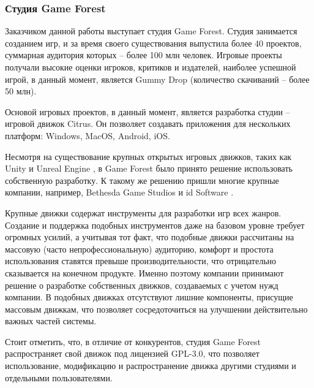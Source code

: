 \documentclass{fefu}
\begin{document}
			\subsubsection{Студия Game Forest}
				\par Заказчиком данной работы выступает студия Game Forest. \cite{GFPortal} 
				Студия занимается созданием игр, и за время своего существования выпустила 
				более 40 проектов, суммарная аудитория которых -- более 100 млн человек. 
				Игровые проекты получали высокие оценки игроков, критиков и издателей, наиболее 
				успешной игрой, в данный момент, является Gummy Drop (количество скачиваний -- 
				более 50 млн)\cite{GummyDropPage}.
				\par Основой игровых проектов, в данный момент, является разработка студии -- 
				игровой движок Citrus. Он позволяет создавать приложения для нескольких
				платформ: Windows, MacOS, Android, iOS.
				\par Несмотря на существование крупных открытых игровых движков, таких как 
				Unity \cite{UnitySite} и Unreal Engine \cite{UnrealEngineSite}, 
				в Game Forest было принято решение использовать собственную разработку. К 
				такому же решению пришли многие крупные компании, например, Bethesda Game 
				Studios \cite{BethesdaEngine} и id Software \cite{idSoftwareEngine}.
				\par Крупные движки содержат инструменты для разработки игр всех жанров. 
				Создание и поддержка подобных инструментов даже на базовом уровне требует 
				огромных усилий, а учитывая тот факт, что подобные движки рассчитаны
				на массовую (часто непрофессиональную) аудиторию, комфорт и простота
				использования ставятся превыше производительности, что отрицательно сказывается
				на конечном продукте. Именно поэтому компании принимают решение о разработке
				собственных движков, создаваемых с учетом нужд компании. В подобных движках
				отсутствуют лишние компоненты, присущие массовым движкам, что позволяет
				сосредоточиться на улучшении действительно важных частей системы.
				\par Стоит отметить, что, в отличие от конкурентов, студия Game
				Forest распространяет свой движок под лицензией GPL-3.0, что позволяет
				использование, модификацию и распространение движка другими студиями и
				отдельными пользователями.
\end{document}
